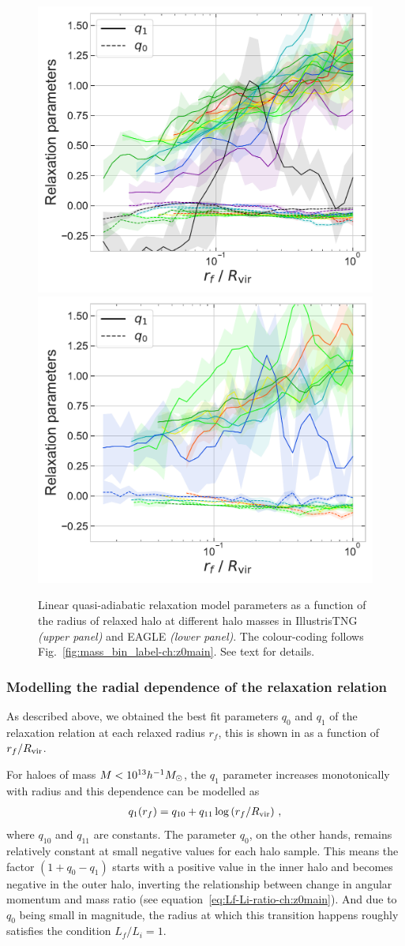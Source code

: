 \begin{figure}
    \centering
    \includegraphics[width=0.49\linewidth]{plots/fit_params_rf_M_T.pdf}
    \includegraphics[width=0.49\linewidth]{plots/fit_params_rf_M_E.pdf}
    \caption{Linear quasi-adiabatic relaxation model parameters as a function of the radius of relaxed halo at different halo masses in IllustrisTNG \emph{(upper panel)} and EAGLE \emph{(lower panel)}. The colour-coding follows Fig.~\ref{fig:mass_bin_label-ch:z0main}. See text for details.}
    \label{fig:rf-fit-params-ch:z0main}
\end{figure}


\subsubsection{Modelling the radial dependence of the relaxation relation}
As described above, we obtained the best fit parameters $q_0$ and $q_1$ of the relaxation relation at each relaxed radius $r_f$, this is shown in  as a function of $r_f/R_{\rm vir}$. 

For haloes of mass $M<10^{13}h^{-1}M_{\odot}$, the $q_1$ parameter increases monotonically with radius and this dependence can be modelled as 
\begin{align}
q_1 (r_f) = q_{10} + q_{11} \log \left( r_f/R_{\rm vir} \right) \,,
\label{eq:q1(r_f)-ch:z0main}
\end{align}
where $q_{10}$ and $q_{11}$ are constants.
The parameter $q_0$, on the other hands, remains relatively constant at small negative values for each halo sample.
This means the factor $(1 + q_0 - q_1)$ starts with a positive value in the inner halo and becomes negative in the outer halo, inverting the relationship between change in angular momentum and mass ratio (see equation~\ref{eq:Lf-Li-ratio-ch:z0main}). And due to $q_0$ being small in magnitude, the radius at which this transition happens roughly satisfies the condition $L_f/L_i=1$. 

